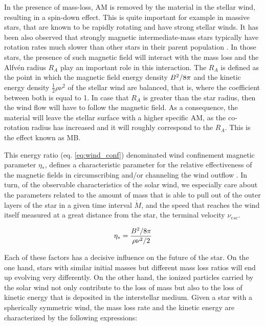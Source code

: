\documentclass[fleqn,usenatbib]{mnras}
\begin{document}
In the presence of mass-loss, AM is removed by the material in the stellar wind, resulting in a spin-down effect. This is quite important for example in massive stars, that are known to be rapidly rotating and have strong stellar winds. It has been also observed that strongly magnetic intermediate-mass stars typically have rotation rates much slower than other stars in their parent population \citep{Mathys2006}. In those stars, the presence of such magnetic field will interact with the mass loss and the Alfv\'{e}n radius $R_{A}$ play an important role in this interaction. The $R_{A}$ is defined as the point in which the magnetic field energy density $B^{2}/8\pi$ and the kinetic energy density $\frac{1}{2}\rho\nu^{2}$ of the stellar wind are balanced, that is, where the coefficient between both is equal to 1. In case that $R_{A}$ is greater than the star radius, then the wind flow will have to follow the magnetic field. As a consequence, the material will leave the stellar surface with a higher specific AM, as the co-rotation radius has increased and it will roughly correspond to the $R_{A}$. This is the effect known as MB.\par

This energy ratio (eq. \ref{eq:wind_conf}) denominated wind confinement magnetic parameter $\eta_*$, defines a characteristic parameter for the relative effectiveness of the magnetic fields in circumscribing and/or channeling the wind outflow \citep{UdDoula2002}. In turn, of the observable characteristics of the solar wind, we especially care about the parameters related to the amount of mass that is able to pull out of the outer layers of the star in a given time interval $\Dot{M}$, and the speed that reaches the wind itself measured at a great distance from the star, the terminal velocity $\nu_{esc}$.\par

\begin{ceqn}
\begin{equation}
    \eta_* = \frac{B^{2}/8\pi}{\rho\nu^2/2} \label{eq:wind_conf}
\end{equation}
\end{ceqn}

Each of these factors has a decisive influence on the future of the star. On the one hand, stars with similar initial masses but different mass loss ratios will end up evolving very differently. On the other hand, the ionized particles carried by the solar wind not only contribute to the loss of mass but also to the loss of kinetic energy that is deposited in the interstellar medium. Given a star with a spherically symmetric wind, the mass loss rate and the kinetic energy are characterized by the following expressions:
\end{document}
